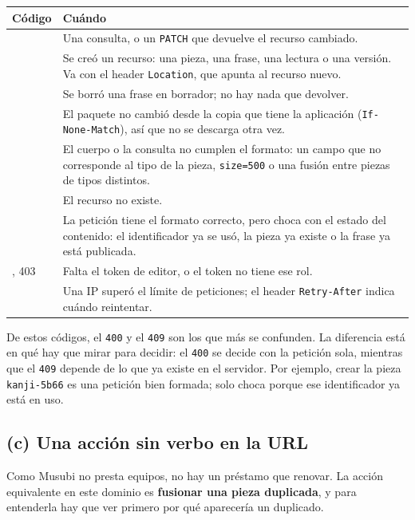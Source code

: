 \documentclass[11pt]{article}
\begin{document}
\begin{center}
\small
\renewcommand{\arraystretch}{1.25}
\begin{tabular}{@{}>{\raggedright\arraybackslash}p{1.6cm}>{\raggedright\arraybackslash}p{13.2cm}@{}}
\hline
Código & Cuándo \\
\hline
200 & Una consulta, o un \texttt{PATCH} que devuelve el recurso cambiado. \\
201 & Se creó un recurso: una pieza, una frase, una lectura o una versión. Va con el header \texttt{Location}, que apunta al recurso nuevo. \\
204 & Se borró una frase en borrador; no hay nada que devolver. \\
304 & El paquete no cambió desde la copia que tiene la aplicación (\texttt{If-None-Match}), así que no se descarga otra vez. \\
400 & El cuerpo o la consulta no cumplen el formato: un campo que no corresponde al tipo de la pieza, \texttt{size=500} o una fusión entre piezas de tipos distintos. \\
404 & El recurso no existe. \\
409 & La petición tiene el formato correcto, pero choca con el estado del contenido: el identificador ya se usó, la pieza ya existe o la frase ya está publicada. \\
401, 403 & Falta el token de editor, o el token no tiene ese rol. \\
429 & Una IP superó el límite de peticiones; el header \texttt{Retry-After} indica cuándo reintentar. \\
\hline
\end{tabular}
\end{center}

De estos códigos, el \texttt{400} y el \texttt{409} son los que más se confunden. La diferencia está en qué hay que mirar para decidir: el \texttt{400} se decide con la petición sola, mientras que el \texttt{409} depende de lo que ya existe en el servidor. Por ejemplo, crear la pieza \texttt{kanji-5b66} es una petición bien formada; solo choca porque ese identificador ya está en uso.

\subsection*{(c) Una acción sin verbo en la URL}

Como Musubi no presta equipos, no hay un préstamo que renovar. La acción equivalente en este dominio es \textbf{fusionar una pieza duplicada}, y para entenderla hay que ver primero por qué aparecería un duplicado.
\end{document}

